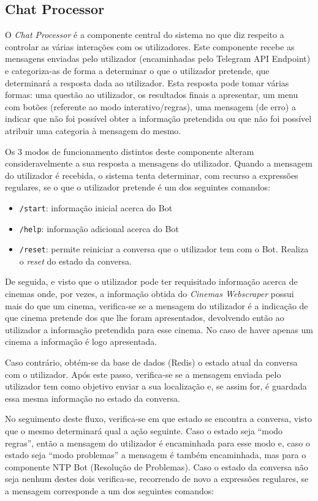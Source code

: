 \documentclass[11pt,a4paper]{article}
\begin{document}
\subsection{Chat Processor}
O \textit{Chat Processor} é a componente central do sistema no que diz respeito a controlar as várias interações com
os utilizadores. Este componente recebe as mensagens enviadas pelo utilizador (encaminhadas pelo Telegram
API Endpoint) e categoriza-as de forma a determinar o que o utilizador pretende, que determinará a resposta
dada ao utilizador. Esta resposta pode tomar várias formas: uma questão ao utilizador, os resultados finais
a apresentar, um menu com botões (referente ao modo interativo/regras), uma mensagem (de erro) a indicar que
não foi possível obter a informação pretendida ou que não foi possível atribuir uma categoria à mensagem do
mesmo.

Os 3 modos de funcionamento distintos deste componente alteram consideravelmente a sua resposta a mensagens
do utilizador. Quando a mensagem do utilizador é recebida, o sistema tenta determinar, com recurso a
expressões regulares, se o que o utilizador pretende é um dos seguintes comandos:
\begin{itemize}
    \item \texttt{/start}: informação inicial acerca do Bot
    \item \texttt{/help}: informação adicional acerca do Bot
    \item \texttt{/reset}: permite reiniciar a conversa que o utilizador tem com o Bot. Realiza o
      \textit{reset} do estado da conversa.
\end{itemize}

De seguida, e visto que o utilizador pode ter requisitado informação acerca de cinemas onde, por vezes, a
informação obtida do \textit{Cinemas Webscraper} possui mais do que um cinema, verifica-se se a mensagem do
utilizador é a indicação de que cinema pretende dos que lhe foram apresentados, devolvendo então ao
utilizador a informação pretendida para esse cinema. No caso de haver apenas um cinema a informação é logo
apresentada.

Caso contrário, obtém-se da base de dados (Redis) o estado atual da conversa com o utilizador. Após este
passo, verifica-se se a mensagem enviada pelo utilizador tem como objetivo enviar a sua localização e, se
assim for, é guardada essa mesma informação no estado da conversa.

No seguimento deste fluxo, verifica-se em que estado se encontra a conversa, visto que o mesmo determinará
qual a ação seguinte. Caso o estado seja ``modo regras'', então a mensagem do utilizador é encaminhada para
esse modo e, caso o estado seja ``modo problemas'' a mensagem é também encaminhada, mas para o componente
NTP Bot (Resolução de Problemas). Caso o estado da conversa não seja nenhum destes dois verifica-se,
recorrendo de novo a expressões regulares, se a mensagem corresponde a um dos seguintes comandos:
\end{document}
